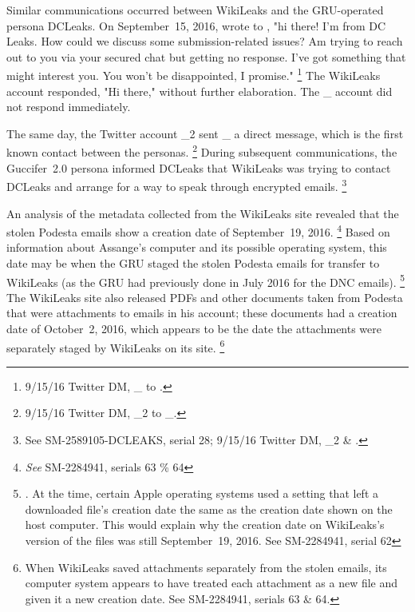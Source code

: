Similar communications occurred between WikiLeaks and the GRU-operated persona DCLeaks.
On September~15, 2016, \@dcleaks wrote to \@WikiLeaks, "hi there!
I'm from DC Leaks.
How could we discuss some submission-related issues?
Am trying to reach out to you via your secured chat but getting no response.
I've got something that might interest you.
You won't be disappointed, I promise."%
\footnote{9/15/16 Twitter DM, \@dcleaks\_ to \@WikiLeaks.}
The WikiLeaks account responded, "Hi there," without further elaboration.
The \@dcleaks\_ account did not respond immediately.

The same day, the Twitter account \@guccifer\_2 sent \@dcleaks\_ a direct message, which is the first known contact between the personas.%
\footnote{9/15/16 Twitter DM, \@guccifer\_2 to \@dcleaks\_.}
During subsequent communications, the Guccifer~2.0 persona informed DCLeaks that WikiLeaks was trying to contact DCLeaks and arrange for a way to speak through encrypted emails.%
\footnote{See SM-2589105-DCLEAKS, serial 28;
9/15/16 Twitter DM, \@Guccifer\_2 \& \@WikiLeaks.}

An analysis of the metadata collected from the WikiLeaks site revealed that the stolen Podesta emails show a  creation date of September~19, 2016.%
\footnote{\textit{See} SM-2284941, serials 63 \% 64 }
Based on information about Assange's computer and its possible operating system, this date may be when the GRU staged the stolen Podesta emails for transfer to WikiLeaks (as the GRU had previously done in July 2016 for the DNC emails).%
\footnote{. At the time, certain Apple operating systems used a setting that left a downloaded file's creation date the same as the creation date shown on the host computer.
This would explain why the creation date on WikiLeaks's version of the files was still September~19, 2016.
See SM-2284941, serial 62 }
The WikiLeaks site also released PDFs and other documents taken from Podesta that were attachments to emails in his account; these documents had a creation date of October~2, 2016, which appears to be the date the attachments were separately staged by WikiLeaks on its site.%
\footnote{When WikiLeaks saved attachments separately from the stolen emails, its computer system appears to have treated each attachment as a new file and given it a new creation date.
See SM-2284941, serials 63 \& 64.}

